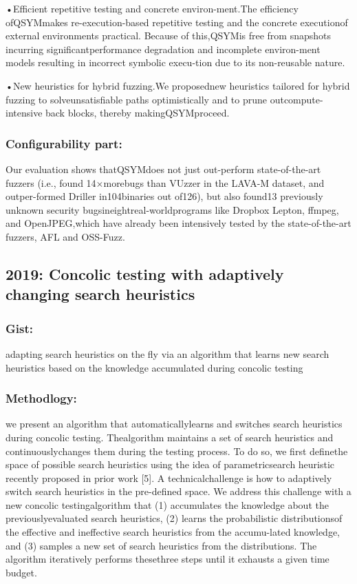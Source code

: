\documentclass[	runningheads,
				a4paper]{llncs}
\begin{document}
•Efficient repetitive testing and concrete environ-ment.The efficiency ofQSYMmakes re-execution-based repetitive testing and the concrete executionof external environments practical. Because of this,QSYMis free from snapshots incurring significantperformance degradation and incomplete environ-ment models resulting in incorrect symbolic execu-tion due to its non-reusable nature.

•New heuristics for hybrid fuzzing.We proposednew heuristics tailored for hybrid fuzzing to solveunsatisfiable paths optimistically and to prune outcompute-intensive  back  blocks,  thereby  makingQSYMproceed.

\subsubsection{Configurability part:}
Our evaluation shows thatQSYMdoes not just out-perform state-of-the-art fuzzers (i.e.,  found 14×morebugs than VUzzer in the LAVA-M dataset, and outper-formed Driller in104binaries out of126), but also found13 previously unknown security bugsineightreal-worldprograms like Dropbox Lepton, ffmpeg, and OpenJPEG,which have already been intensively tested by the state-of-the-art fuzzers, AFL and OSS-Fuzz.


\subsection{2019: Concolic testing with adaptively changing search heuristics}
\subsubsection{Gist:}
adapting search heuristics on the fly via an algorithm that learns new search heuristics based on the knowledge accumulated during concolic testing

\subsubsection{Methodlogy:}
we present an algorithm that automaticallylearns and switches search heuristics during concolic testing. Thealgorithm maintains a set of search heuristics and continuouslychanges them during the testing process. To do so, we first definethe space of possible search heuristics using the idea of parametricsearch heuristic recently proposed in prior work [5]. A technicalchallenge is how to adaptively switch search heuristics in the pre-defined space. We address this challenge with a new concolic testingalgorithm that (1) accumulates the knowledge about the previouslyevaluated search heuristics, (2) learns the probabilistic distributionsof the effective and ineffective search heuristics from the accumu-lated knowledge, and (3) samples a new set of search heuristics from the distributions. The algorithm iteratively performs thesethree steps until it exhausts a given time budget.
\end{document}
